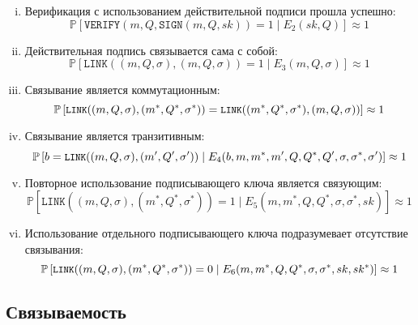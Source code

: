 \documentclass{llncs}
\newcommand{\prob}{\mathbb{P}}
\begin{document}
\begin{definition}
\begin{enumerate}[(i)]
\item Верификация с использованием действительной подписи прошла успешно: $$\prob\left[ \texttt{VERIFY}(m, Q, \texttt{SIGN}(m, Q, sk)) = 1 \mid E_2(sk, Q) \right] \approx 1$$

\item Действительная подпись связывается сама с собой: $$\prob\left[\texttt{LINK}((m, Q, \sigma), (m, Q, \sigma)) = 1 \mid E_3(m, Q, \sigma)\right] \approx 1$$

\item Связывание является коммутационным: $${\small \prob\left[\texttt{LINK}((m, Q, \sigma), (m^*, Q^*, \sigma^*)) = \texttt{LINK}((m^*, Q^*, \sigma^*), (m, Q, \sigma))\right] \approx 1}$$

\item Связывание является транзитивным: $${\small \prob\left[b = \texttt{LINK}((m, Q, \sigma), (m^\prime, Q^\prime, \sigma^\prime)) \mid E_4(b, m, m^*, m^\prime, Q, Q^*, Q^\prime, \sigma, \sigma^*, \sigma^\prime)\right] \approx 1}$$

\item Повторное использование подписывающего ключа является связующим: $$\prob\left[ \texttt{LINK}((m, Q, \sigma), (m^*, Q^*, \sigma^*)) = 1 \mid E_5(m, m^*, Q, Q^*, \sigma, \sigma^*, sk) \right] \approx 1$$

\item Использование отдельного подписывающего ключа подразумевает отсутствие связывания: $${\small \prob\left[ \texttt{LINK}((m, Q, \sigma), (m^*, Q^*, \sigma^*)) = 0 \mid E_6(m, m^*, Q, Q^*, \sigma, \sigma^*, sk, sk^*) \right] \approx 1}$$
\end{enumerate}
\end{definition}


\subsection{Связываемость}
\end{document}
